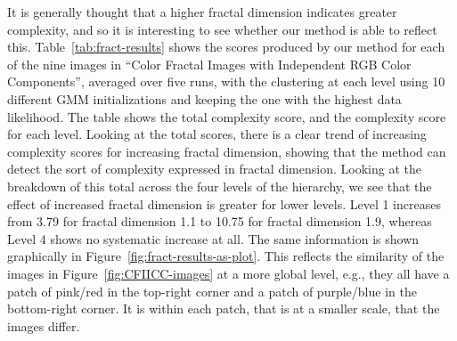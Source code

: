 \documentclass[a4paper,fleqn]{cas-sc}
\theoremstyle{remark}
\begin{document}
It is generally thought that a higher fractal dimension indicates greater complexity, and so it is interesting to see whether our method is able to reflect this. Table~\ref{tab:fract-results} shows the scores produced by our method for each of the nine images in ``Color Fractal Images with Independent RGB Color Components'', averaged over five runs, with the clustering at each level using 10 different GMM initializations and keeping the one with the highest data likelihood. The table shows the total complexity score, and the complexity score for each level. Looking at the total scores, there is a clear trend of increasing complexity scores for increasing fractal dimension, showing that the method can detect the sort of complexity expressed in fractal dimension. Looking at the breakdown of this total across the four levels of the hierarchy, we see that the effect of increased fractal dimension is greater for lower levels. Level 1 increases from 3.79 for fractal dimension 1.1 to 10.75 for fractal dimension 1.9, whereas Level 4 shows no systematic increase at all. The same information is shown graphically in Figure~\ref{fig:fract-results-as-plot}. This reflects the similarity of the images in Figure~\ref{fig:CFIICC-images} at a more global level, e.g., they all have a patch of pink/red in the top-right corner and a patch of purple/blue in the bottom-right corner. It is within each patch, that is at a smaller scale, that the images differ. 
\end{document}
